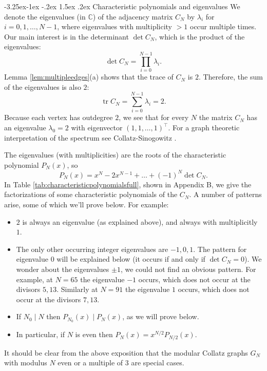 \documentclass[10pt]{article}
\makeatletter
\renewcommand\subsection{\@startsection{subsection}{2}{\z@}
{-3.25ex\@plus -1ex \@minus -.2ex}
{1.5ex \@plus .2ex}
{\normalfont\normalsize\bfseries\boldmath}}
\theoremstyle{definition}
\newcommand{\C}{\mathbb{C}}
\newcommand{\dsum}{\displaystyle\sum}
\DeclareMathOperator{\trace}{tr}
\makeatother
\begin{document}
\subsection{Characteristic polynomials and eigenvalues}
We denote the eigenvalues (in $ \C $) of the adjacency matrix $ C_N $ by $ \lambda_i $ for
$ i = 0, 1, \ldots, N-1 $, where eigenvalues with multiplicity $ > 1 $ occur multiple times. Our main
interest is in the determinant $ \det C_N $, which is the product of the eigenvalues:
\[ \det C_N = \prod_{i=0}^{N-1} \lambda_i . \]
Lemma \ref{lem:multipleedges}(a) shows that the trace of $ C_N $ is $ 2 $. Therefore, the sum of the
eigenvalues is also $ 2 $:
\[ \trace C_N = \dsum_{i=0}^{N-1} \lambda_i = 2 . \]
Because each vertex has outdegree $ 2 $, we see that for every $ N $ the matrix $ C_N $ has an eigenvalue
$ \lambda_0 = 2 $ with eigenvector $ (1,1,\ldots,1)^{\top} $. For a graph theoretic interpretation of the
spectrum see Collatz-Sinogowitz \cite{CS}.

The eigenvalues (with multiplicities) are the roots of the characteristic polynomial $ P_N(x) $, so
\[ P_N(x) = x^N - 2 x^{N-1} + \ldots + (-1)^N \det C_N . \]
In Table \ref{tab:characteristicpolynomialsfull}, shown in Appendix B, we give the factorizations of some
characteristic polynomials of the $ C_N $. A number of patterns arise, some of which we'll prove below.
For example:
\begin{itemize} \setlength{\itemsep}{0pt}
    \item $ 2 $ is always an eigenvalue (as explained above), and always with multiplicitly $ 1 $.
    \item The only other occurring integer eigenvalues are $ -1, 0, 1 $. The pattern for eigenvalue $ 0 $
    will be explained below (it occurs if and only if $ \det C_N = 0 $). We wonder about the eigenvalues
    $ \pm 1 $, we could not find an obvious pattern. For example, at $ N = 65 $ the eigenvalue $ -1 $
    occurs, which does not occur at the divisors $ 5, 13 $. Similarly at $ N = 91 $ the eigenvalue $ 1 $
    occurs, which does not occur at the divisors $ 7, 13 $.
    \item If $ N_0 \mid N $ then $ P_{N_0}(x) \mid P_N(x) $, as we will prove below.
    \item In particular, if $ N $ is even then $ P_N(x) = x^{N/2} P_{N/2}(x) $.
\end{itemize}
It should be clear from the above exposition that the modular Collatz graphs $ G_N $ with modulus
$ N $ even or a multiple of $ 3 $ are special cases.
\end{document}
